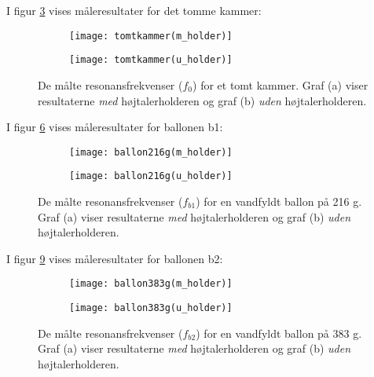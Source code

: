 I figur \ref{fig:tomkam} vises måleresultater for det tomme kammer: 
\begin{figure}[H]
\centering
   \begin{subfigure}[b]{1\textwidth}
   \texttt{[image: tomtkammer(m\_holder)]}
   \caption{}
   \label{fig:Ng1} 
\end{subfigure}

\begin{subfigure}[b]{1\textwidth}
   \texttt{[image: tomtkammer(u\_holder)]}
   \caption{}
   \label{fig:Ng2}
\end{subfigure}

\caption[Two numerical solutions]{De målte resonansfrekvenser ($f_{0}$) for et tomt kammer. Graf (a) viser resultaterne \textit{med} højtalerholderen og graf (b) \textit{uden} højtalerholderen.}
\label{fig:tomkam}
\end{figure}

\newpage

I figur \ref{fig:b1} vises måleresultater for ballonen b1:
\begin{figure}[H]
\centering
   \begin{subfigure}[b]{1\textwidth}
   \texttt{[image: ballon216g(m\_holder)]}
   \caption{}
   \label{fig:Ng1} 
\end{subfigure}

\begin{subfigure}[b]{1\textwidth}
   \texttt{[image: ballon216g(u\_holder)]}
   \caption{}
   \label{fig:Ng2}
\end{subfigure}

\caption[Two numerical solutions]{De målte resonansfrekvenser ($f_{b1}$) for en vandfyldt ballon på 216 g. Graf (a) viser resultaterne \textit{med} højtalerholderen og graf (b) \textit{uden} højtalerholderen.}
\label{fig:b1}
\end{figure}

\newpage

I figur \ref{fig:b2} vises måleresultater for ballonen b2: 
\begin{figure}[H]
\centering
   \begin{subfigure}[b]{1\textwidth}
   \texttt{[image: ballon383g(m\_holder)]}
   \caption{}
   \label{fig:Ng1} 
\end{subfigure}

\begin{subfigure}[b]{1\textwidth}
   \texttt{[image: ballon383g(u\_holder)]}
   \caption{}
   \label{fig:Ng2}
\end{subfigure}

\caption[Two numerical solutions]{De målte resonansfrekvenser ($f_{b2}$) for en vandfyldt ballon på 383 g. Graf (a) viser resultaterne \textit{med} højtalerholderen og graf (b) \textit{uden} højtalerholderen.}
\label{fig:b2}
\end{figure}

